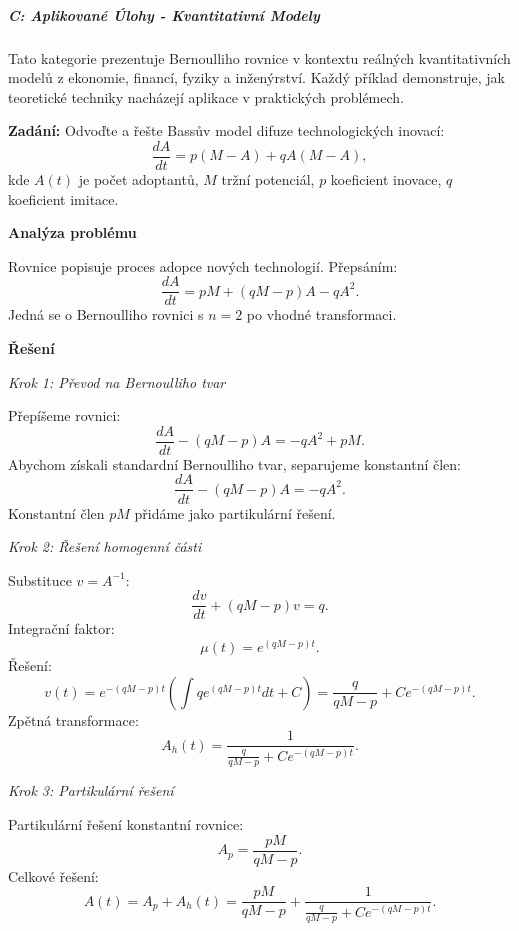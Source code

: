 \subparagraph*{C: Aplikované Úlohy - Kvantitativní Modely}
\label{subpar:c-aplikovane-ulohy}

Tato kategorie prezentuje Bernoulliho rovnice v kontextu reálných kvantitativních modelů 
z ekonomie, financí, fyziky a inženýrství. Každý příklad demonstruje, jak teoretické 
techniky nacházejí aplikace v praktických problémech.

\vspace{1\baselineskip}

\begin{example}
\label{ex:c1-bassuv-model}

\noindent\textbf{Zadání:} Odvoďte a řešte Bassův model difuze technologických inovací:
\[
\frac{dA}{dt} = p(M - A) + qA(M - A),
\]
kde $A(t)$ je počet adoptantů, $M$ tržní potenciál, $p$ koeficient inovace, 
$q$ koeficient imitace.

\vspace{1.5\baselineskip}

\noindent\textbf{Analýza problému}

\noindent Rovnice popisuje proces adopce nových technologií. Přepsáním:
\[
\frac{dA}{dt} = pM + (qM - p)A - qA^2.
\]
Jedná se o Bernoulliho rovnici s $n = 2$ po vhodné transformaci.

\vspace{1.5\baselineskip}

\noindent\textbf{Řešení}

\noindent\textit{Krok 1: Převod na Bernoulliho tvar}

Přepíšeme rovnici:
\[
\frac{dA}{dt} - (qM - p)A = -qA^2 + pM.
\]
Abychom získali standardní Bernoulliho tvar, separujeme konstantní člen:
\[
\frac{dA}{dt} - (qM - p)A = -qA^2.
\]
Konstantní člen $pM$ přidáme jako partikulární řešení.

\noindent\textit{Krok 2: Řešení homogenní části}

Substituce $v = A^{-1}$:
\[
\frac{dv}{dt} + (qM - p)v = q.
\]
Integrační faktor:
\[
\mu(t) = e^{(qM - p)t}.
\]
Řešení:
\[
v(t) = e^{-(qM - p)t} \left( \int q e^{(qM - p)t} dt + C \right) = \frac{q}{qM - p} + Ce^{-(qM - p)t}.
\]
Zpětná transformace:
\[
A_h(t) = \frac{1}{\frac{q}{qM - p} + Ce^{-(qM - p)t}}.
\]

\noindent\textit{Krok 3: Partikulární řešení}

Partikulární řešení konstantní rovnice:
\[
A_p = \frac{pM}{qM - p}.
\]
Celkové řešení:
\[
A(t) = A_p + A_h(t) = \frac{pM}{qM - p} + \frac{1}{\frac{q}{qM - p} + Ce^{-(qM - p)t}}.
\]


\end{example}
